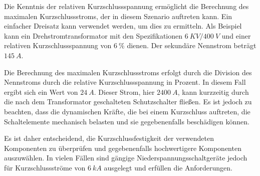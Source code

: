 \begin{enumerate}[label=\alph*)]
	      Die Kenntnis der relativen Kurzschlussspannung ermöglicht die Berechnung des
	      maximalen Kurzschlussstroms, der in diesem Szenario auftreten kann. Ein
	      einfacher Dreisatz kann verwendet werden, um dies zu ermitteln. Als Beispiel
	      kann ein Drehstromtransformator mit den Spezifikationen $6\ KV / 400\ V$ und
	      einer relativen Kurzschlussspannung von $6\ \%$ dienen. Der sekundäre Nennstrom
	      beträgt $145\ A$.

	      Die Berechnung des maximalen Kurzschlussstroms erfolgt durch die Division des
	      Nennstroms durch die relative Kurzschlussspannung in Prozent. In diesem Fall
	      ergibt sich ein Wert von $24\ A$. Dieser Strom, hier $2400\ A$, kann kurzzeitig
	      durch die nach dem Transformator geschalteten Schutzschalter fließen. Es ist
	      jedoch zu beachten, dass die dynamischen Kräfte, die bei einem Kurzschluss
	      auftreten, die Schaltelemente mechanisch belasten und sie gegebenenfalls
	      beschädigen können.

	      Es ist daher entscheidend, die Kurzschlussfestigkeit der verwendeten
	      Komponenten zu überprüfen und gegebenenfalls hochwertigere Komponenten
	      auszuwählen. In vielen Fällen sind gängige Niederspannungsschaltgeräte jedoch
	      für Kurzschlussströme von $6\ kA$ ausgelegt und erfüllen die Anforderungen.
\end{enumerate}

